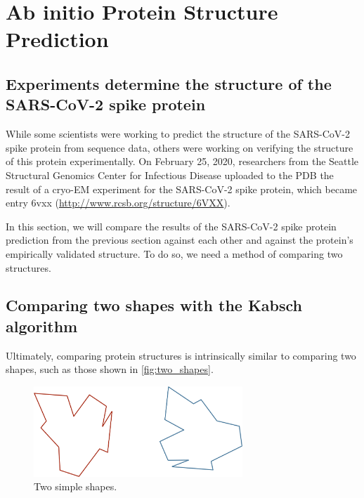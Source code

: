 \FloatBarrier
{}

\section{Ab initio Protein Structure Prediction}
\label{sec:accuracy}
\subsection{Experiments determine the structure of the SARS-CoV-2 spike protein}

While some scientists were working to predict the structure of the SARS-CoV-2 spike protein from sequence data, others were working on verifying the structure of this protein experimentally. On February 25, 2020, researchers from the Seattle Structural Genomics Center for Infectious Disease uploaded to the PDB the result of a cryo-EM experiment for the SARS-CoV-2 spike protein, which became entry 6vxx (\url{http://www.rcsb.org/structure/6VXX}).

\begin{note}\end{note}

In this section, we will compare the results of the SARS-CoV-2 spike protein prediction from the previous section against each other and against the protein's empirically validated structure. To do so, we need a method of comparing two structures.

\FloatBarrier
{}
\subsection{Comparing two shapes with the Kabsch algorithm}

Ultimately, comparing protein structures is intrinsically similar to comparing two shapes, such as those shown in \autoref{fig:two_shapes}.

\begin{qbox}\end{qbox}

\begin{figure}[h]
	\centering
	\mySfFamily
	\includegraphics[width = 0.7\textwidth]{../images/two_shapes.png}
	\caption{Two simple shapes.}
	\label{fig:two_shapes}
\end{figure}

